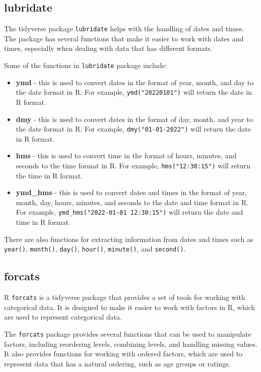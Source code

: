 \documentclass[
]{book}
\providecommand{\tightlist}{%
  \setlength{\itemsep}{0pt}\setlength{\parskip}{0pt}}
\begin{document}
\hypertarget{lubridate}{%
\subsection{lubridate}\label{lubridate}}

The tidyverse package \texttt{lubridate} helps with the handling of dates and times. The package has several functions that make it easier to work with dates and times, especially when dealing with data that has different formats.

Some of the functions in \texttt{lubridate} package include:

\begin{itemize}
\tightlist
\item
  \textbf{ymd} - this is used to convert dates in the format of year, month, and day to the date format in R. For example, \texttt{ymd("20220101")} will return the date in R format.
\item
  \textbf{dmy} - this is used to convert dates in the format of day, month, and year to the date format in R. For example, \texttt{dmy("01-01-2022")} will return the date in R format.
\item
  \textbf{hms} - this is used to convert time in the format of hours, minutes, and seconds to the time format in R. For example, \texttt{hms("12:30:15")} will return the time in R format.
\item
  \textbf{ymd\_hms} - this is used to convert dates and times in the format of year, month, day, hours, minutes, and seconds to the date and time format in R. For example, \texttt{ymd\_hms("2022-01-01\ 12:30:15")} will return the date and time in R format.
\end{itemize}

There are also functions for extracting information from dates and times such as \texttt{year()}, \texttt{month()}, \texttt{day()}, \texttt{hour()}, \texttt{minute()}, and \texttt{second()}.

\hypertarget{forcats}{%
\subsection{forcats}\label{forcats}}

R \texttt{forcats} is a tidyverse package that provides a set of tools for working with categorical data. It is designed to make it easier to work with factors in R, which are used to represent categorical data.

The \texttt{forcats} package provides several functions that can be used to manipulate factors, including reordering levels, combining levels, and handling missing values. It also provides functions for working with ordered factors, which are used to represent data that has a natural ordering, such as age groups or ratings.
\end{document}
